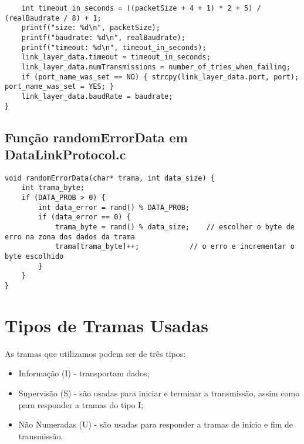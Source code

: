 \documentclass[11pt,a4paper,reqno]{report}
\numberwithin{equation}{section}
\begin{document}
\begin{appendices}
\begin{lstlisting}
	int timeout_in_seconds = ((packetSize + 4 + 1) * 2 + 5) / (realBaudrate / 8) + 1;
	printf("size: %d\n", packetSize);
	printf("baudrate: %d\n", realBaudrate);
	printf("timeout: %d\n", timeout_in_seconds);
	link_layer_data.timeout = timeout_in_seconds;
	link_layer_data.numTransmissions = number_of_tries_when_failing;
	if (port_name_was_set == NO) { strcpy(link_layer_data.port, port); port_name_was_set = YES; }
	link_layer_data.baudRate = baudrate;
}
\end{lstlisting}

\section{Função randomErrorData em DataLinkProtocol.c }
\label{randomErrorData}
\begin{lstlisting}
void randomErrorData(char* trama, int data_size) {	
	int trama_byte;
	if (DATA_PROB > 0) {
		int data_error = rand() % DATA_PROB;
		if (data_error == 0) {
			trama_byte = rand() % data_size;	// escolher o byte de erro na zona dos dados da trama
			trama[trama_byte]++;			// o erro e incrementar o byte escolhido
		}
	}
}
\end{lstlisting}




\chapter{Tipos de Tramas Usadas}
\label{tramas}

As tramas que utilizamos podem ser de três tipos:
\begin{itemize}
	\item Informação (I) - transportam dados;
	\item Supervisão (S) - são usadas para iniciar e terminar a transmissão, assim como para responder a tramas do tipo I;
	\item Não Numeradas (U) - são usadas para responder a tramas de início e fim de transmissão.
\end{itemize}


\end{appendices}
\end{document}
